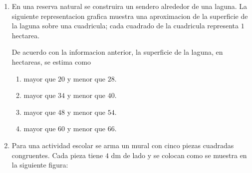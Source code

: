 \documentclass[12pt]{article}
\begin{document}
\begin{enumerate}[label=\textbf{\arabic*.}, itemsep=1.05cm]
Si se coloca una cinta alrededor de todo el borde de esa senal, \textquestiondown cuantos centimetros de cinta se necesitan?

\begin{enumerate}[label=\Alph*)]
  \item $27$
  \item $36$
  \item $54$
  \item $108$
\end{enumerate}

\Needspace{0.92\textheight}
\item
En una reserva natural se construira un sendero alrededor de una laguna. La siguiente representacion grafica muestra una aproximacion de la superficie de la laguna sobre una cuadricula; cada cuadrado de la cuadricula representa $1$ hectarea.

\begin{center}
\end{center}

De acuerdo con la informacion anterior, la superficie de la laguna, en hectareas, se estima como

\begin{enumerate}[label=\Alph*)]
  \item mayor que $20$ y menor que $28$.
  \item mayor que $34$ y menor que $40$.
  \item mayor que $48$ y menor que $54$.
  \item mayor que $60$ y menor que $66$.
\end{enumerate}

\Needspace{0.88\textheight}
\item
Para una actividad escolar se arma un mural con cinco piezas cuadradas congruentes. Cada pieza tiene $4$ dm de lado y se colocan como se muestra en la siguiente figura:


\end{enumerate}
\end{document}
